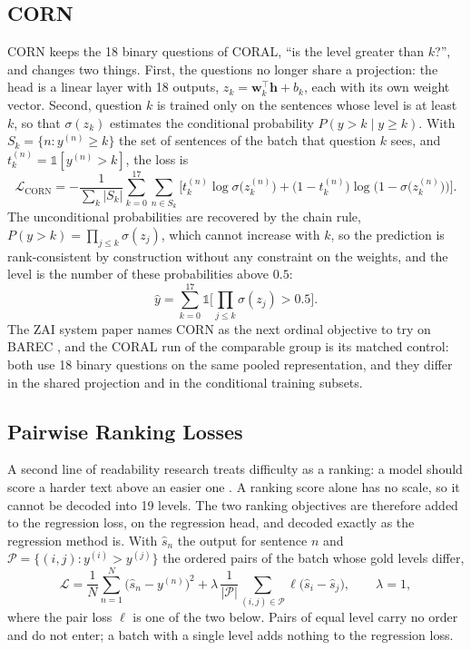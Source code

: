 \subsection{CORN}

CORN \cite{shi2023corn} keeps the 18 binary questions of CORAL, ``is the level greater than
$k$?'', and changes two things. First, the questions no longer share a projection: the head is a
linear layer with 18 outputs, $z_k = \mathbf{w}_k^{\top}\mathbf{h} + b_k$, each with its own
weight vector. Second, question $k$ is trained only on the sentences whose level is at least $k$,
so that $\sigma(z_k)$ estimates the conditional probability $P(y>k \mid y\geq k)$. With
$S_k=\{n : y^{(n)}\geq k\}$ the set of sentences of the batch that question $k$ sees, and
$t_k^{(n)}=\mathbb{1}[y^{(n)}>k]$, the loss is
\begin{equation}
\mathcal{L}_{\text{CORN}} = -\frac{1}{\sum_{k}|S_k|}\sum_{k=0}^{17}\sum_{n\in S_k}
\Big[t_k^{(n)}\log\sigma\big(z_k^{(n)}\big)+\big(1-t_k^{(n)}\big)\log\big(1-\sigma\big(z_k^{(n)}\big)\big)\Big].
\end{equation}
The unconditional probabilities are recovered by the chain rule,
$P(y>k)=\prod_{j\leq k}\sigma(z_j)$, which cannot increase with $k$, so the prediction is
rank-consistent by construction without any constraint on the weights, and the level is the
number of these probabilities above $0.5$:
\begin{equation}
\hat{y} = \sum_{k=0}^{17}\mathbb{1}\Big[\prod_{j\leq k}\sigma(z_j) > 0.5\Big].
\end{equation}
The ZAI system paper names CORN as the next ordinal objective to try on BAREC
\cite{nazzal2025zai}, and the CORAL run of the comparable group is its matched control: both use
18 binary questions on the same pooled representation, and they differ in the shared projection
and in the conditional training subsets.

\subsection{Pairwise Ranking Losses}

A second line of readability research treats difficulty as a ranking: a model should score a
harder text above an easier one \cite{lee2022neural,trokhymovych2024readability}. A ranking score
alone has no scale, so it cannot be decoded into 19 levels. The two ranking objectives are
therefore added to the regression loss, on the regression head, and decoded exactly as the
regression method is. With $\hat{s}_n$ the output for sentence $n$ and
$\mathcal{P}=\{(i,j) : y^{(i)}>y^{(j)}\}$ the ordered pairs of the batch whose gold levels
differ,
\begin{equation}
\mathcal{L} = \frac{1}{N}\sum_{n=1}^{N}\big(\hat{s}_n-y^{(n)}\big)^2
+ \lambda\,\frac{1}{|\mathcal{P}|}\sum_{(i,j)\in\mathcal{P}}\ell\big(\hat{s}_i-\hat{s}_j\big),
\qquad \lambda = 1 ,
\end{equation}
where the pair loss $\ell$ is one of the two below. Pairs of equal level carry no order and do
not enter; a batch with a single level adds nothing to the regression loss.

